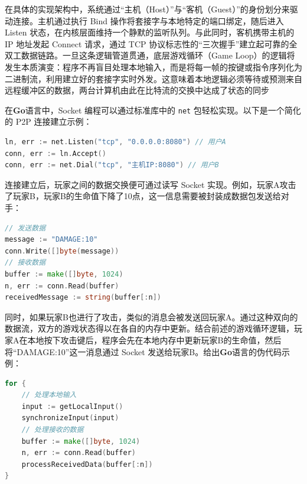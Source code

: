 在具体的实现架构中，系统通过“主机（Host）”与“客机（Guest）”的身份划分来驱动连接。主机通过执行 Bind 操作将套接字与本地特定的端口绑定，随后进入 Listen 状态，在内核层面维持一个静默的监听队列。与此同时，客机携带主机的 IP 地址发起 Connect 请求，通过 TCP 协议标志性的“三次握手”建立起可靠的全双工数据链路。一旦这条逻辑管道贯通，底层游戏循环（Game Loop）的逻辑将发生本质演变：程序不再盲目处理本地输入，而是将每一帧的按键或指令序列化为二进制流，利用建立好的套接字实时外发。这意味着本地逻辑必须等待或预测来自远程缓冲区的数据，两台计算机由此在比特流的交换中达成了状态的同步

在\textbf{Go}语言中，Socket 编程可以通过标准库中的 \texttt{net} 包轻松实现。以下是一个简化的 P2P 连接建立示例：

\begin{tcolorbox}[title=P2P 连接建立示例]
\begin{lstlisting}[style=codeblock, language=go]
ln, err := net.Listen("tcp", "0.0.0.0:8080") // 用户A
conn, err := ln.Accept()
conn, err := net.Dial("tcp", "主机IP:8080") // 用户B
\end{lstlisting}
\end{tcolorbox}

连接建立后，玩家之间的数据交换便可通过读写 Socket 实现。例如，玩家A攻击了玩家B，玩家B的生命值下降了10点，这一信息需要被封装成数据包发送给对手：

\begin{tcolorbox}[title=数据包发送示例]
\begin{lstlisting}[style=codeblock, language=go]
// 发送数据
message := "DAMAGE:10"
conn.Write([]byte(message))
// 接收数据
buffer := make([]byte, 1024)
n, err := conn.Read(buffer)
receivedMessage := string(buffer[:n])
\end{lstlisting}
\end{tcolorbox}
同时，如果玩家B也进行了攻击，类似的消息会被发送回玩家A。通过这种双向的数据流，双方的游戏状态得以在各自的内存中更新。结合前述的游戏循环逻辑，玩家A在本地按下攻击键后，程序会先在本地内存中更新玩家B的生命值，然后将“DAMAGE:10”这一消息通过 Socket 发送给玩家B。给出\textbf{Go}语言的伪代码示例：
\begin{tcolorbox}[title=游戏循环中的数据交换示例]
\begin{lstlisting}[style=codeblock, language=go]
for {
    // 处理本地输入
    input := getLocalInput()
    synchronizeInput(input)
    // 处理接收的数据
    buffer := make([]byte, 1024)
    n, err := conn.Read(buffer)
    processReceivedData(buffer[:n])
}
\end{lstlisting}
\end{tcolorbox}


